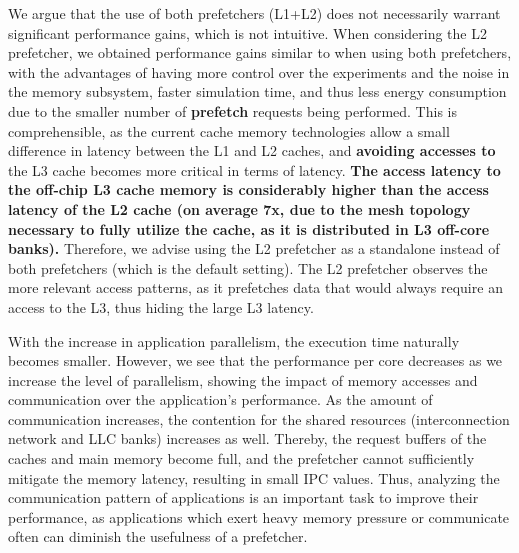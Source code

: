 \documentclass[AMA,final,STIX1COL]{WileyNJD-v2}
\newcommand\new[1]{{\color{red}\textbf{#1}}}
\begin{document}
We argue that the use of both prefetchers (L1+L2) does not necessarily warrant significant performance gains, which is not intuitive.
When considering the L2 prefetcher, we obtained performance gains similar to when using both prefetchers, with the advantages of having more control over the experiments and the noise in the memory subsystem, faster simulation time, and thus less energy consumption due to the smaller number of \new{prefetch} requests being performed. 
This is comprehensible, as the current cache memory technologies allow a small difference in latency between the L1 and L2 caches, and \new{avoiding accesses to} the L3 cache becomes more critical in terms of latency.
\new{The access latency to the off-chip L3 cache memory is considerably higher than the access latency of the L2 cache (on average 7x, due to the mesh topology necessary to fully utilize the cache, as it is distributed in L3 off-core banks).}
Therefore, we advise using the L2 prefetcher as a standalone instead of both prefetchers (which is the default setting).
The L2 prefetcher observes the more relevant access patterns, as it prefetches data that would always require an access to the L3, thus hiding the large L3 latency.


With the increase in application parallelism, the execution time naturally becomes smaller. 
However, we see that the performance per core decreases as we increase the level of parallelism, showing the impact of memory accesses and communication over the application's performance.
As the amount of communication increases, the contention for the shared resources (interconnection network and LLC banks) increases as well.
Thereby, the request buffers of the caches and main memory become full, and the prefetcher cannot sufficiently mitigate the memory latency, resulting in small IPC values.
Thus, analyzing the communication pattern of applications is an important task to improve their performance, as applications which exert heavy memory pressure or communicate often can diminish the usefulness of a prefetcher.
\end{document}

